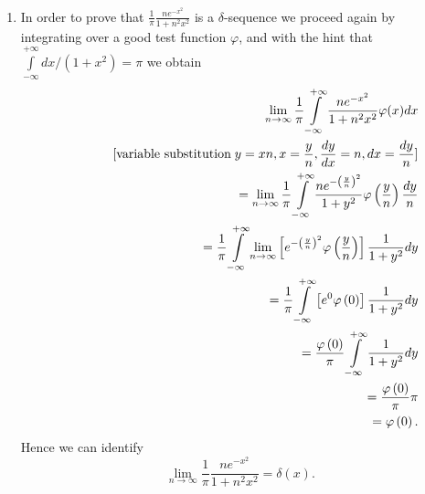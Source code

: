 {\begin{enumerate}
 \item
In order to prove that $\frac{1}{\pi} \frac{n  e^{-x^2}}{1+n^2x^2} $ is  a  $\delta$-sequence
we proceed again by integrating over a good test function $\varphi$,
and with the hint that $\int\limits_{-\infty}^{+\infty} dx/ (1+x^2) =\pi$ we obtain
 \begin{equation}
\begin{split}
\lim_{n \rightarrow \infty}  \frac{1}{\pi}
\int\limits_{-\infty}^{+\infty}
\frac{n  e^{-x^2}}{1+n^2x^2}
   \varphi(x)
dx
\\ \qquad \qquad \textrm{[variable substitution}\;   y={xn} , x={y\over n}, {dy\over dx}={n}, dx={dy\over n}
\textrm{]}
\\ \qquad =
\lim_{n \rightarrow \infty}   \frac{1}{\pi}
\int\limits_{-\infty}^{+\infty}
\frac{n  e^{-\left( \frac{y}{n} \right)^2}}{1+y^2}
   \varphi \left( \frac{y}{n} \right)
\frac{dy}{n}
\\ \qquad =
\frac{1}{\pi}
\int\limits_{-\infty}^{+\infty}
\lim_{n \rightarrow \infty}  \left[     e^{-\left( \frac{y}{n} \right)^2}  \varphi \left( \frac{y}{n} \right) \right]
\frac{1}{1+y^2}
dy
\\ \qquad =       \frac{1}{\pi}
\int\limits_{-\infty}^{+\infty}
\left[     e^{0}  \varphi \left( 0\right) \right]
\frac{1}{1+y^2}
dy
\\ \qquad =    \frac{\varphi \left( 0\right)}{\pi}
\int\limits_{-\infty}^{+\infty}
\frac{1}{1+y^2}
dy
\\ \qquad =
\frac{\varphi \left( 0\right)}{\pi} \pi
\\ \qquad =
\varphi \left( 0\right).
\end{split}
\end{equation}
Hence we can identify
\begin{equation}
   \lim_{n \rightarrow \infty}{\frac{1}{\pi} \frac{n  e^{-x^2}}{1+n^2x^2}}=\delta(x).
\end{equation}


\end{enumerate}}
